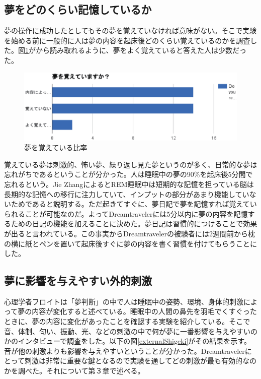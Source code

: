 \subsection{夢をどのくらい記憶しているか}
夢の操作に成功したとしてもその夢を覚えていなければ意味がない。そこで実験を始める前に一般的に人は夢の内容を起床後どのくらい覚えているのかを調査した。図\ref{rememberDream}がから読み取れるように、夢をよく覚えていると答えた人は少数だった。

\begin{figure}[htbp]
\begin{center}
\includegraphics[width=15cm]{eps/remember.eps}
\caption{夢を覚えている比率}
\label{rememberDream}
\end{center}
\end{figure}

覚えている夢は刺激的、怖い夢、繰り返し見た夢というのが多く、日常的な夢は忘れがちであるということが分かった。人は睡眠中の夢の90\%を起床後5分間で忘れるという。Jie ZhangによるとREM睡眠中は短期的な記憶を担っている脳は長期的な記憶への移行に注力していて、インプットの部分があまり機能していないためであると説明する。ただ起きてすぐに、夢日記で夢を記憶すれば覚えていられることが可能なのだ\cite{forgetDreams}。よってDreamtravelerには5分以内に夢の内容を記憶するための日記の機能を加えることに決めた。夢日記は習慣的につけることで効果が出ると言われている。この事実からDreamtravelerの被験者には2週間前から枕の横に紙とペンを置いて起床後すぐに夢の内容を書く習慣を付けてもらうことにした。

\subsection{夢に影響を与えやすい外的刺激}
心理学者フロイトは「夢判断」の中で人は睡眠中の姿勢、環境、身体的刺激によって夢の内容が変化すると述べている\cite{freud}。睡眠中の人間の鼻先を羽毛でくすぐったときに、夢の内容に変化があったことを確認する実験を紹介している。そこで音、体制、匂い、振動、光、などの刺激の中で何が夢に一番影響を与えやすいのかのインタビューで調査をした。以下の図\ref{externalShigeki}がその結果を示す。音が他の刺激よりも影響を与えやすいということが分かった。Dreamtravelerにとって刺激は非常に重要な鍵となるので実験を通してどの刺激が最も有効的なのかを調べた。それについて第３章で述べる。

